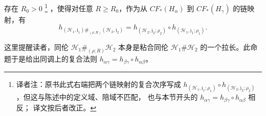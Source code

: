 \begin{proposition}
\label{prop:composition-gluing-chain-maps}
存在 $R_0>0$
\footnote{译者注：原书此式右端把两个链映射的复合次序写成
$h_{(\mathcal H_1,\mathfrak j_1;\rho_1)}\circ
h_{(\mathcal H_2,\mathfrak j_2;\rho_2)}$，但这与陈述中的定义域、陪域不匹配，
也与本节开头的 $h_{\alpha\gamma}=h_{\beta\gamma}\circ h_{\alpha\beta}$ 相反；
译文按后者改正。}
，使得对任意 $R\geq R_0$，作为从 $CF_*(H_\alpha)$ 到
$CF_*(H_\gamma)$ 的链映射，有
\[
 h_{(\mathcal H_1,\mathfrak j_1)\#_{(\rho;R)}
 (\mathcal H_2,\mathfrak j_2)}
 =h_{(\mathcal H_2,\mathfrak j_2;\rho_2)}
 \circ h_{(\mathcal H_1,\mathfrak j_1;\rho_1)}.
\]
\end{proposition}

这里提醒读者，同伦 $\mathcal H_1\#_{(\rho;R)}\mathcal H_2$ 本身是粘合同伦
$\mathcal H_1\#\mathcal H_2$ 的一个拉长。此命题于是给出同调上的复合法则
$h_{\alpha\gamma}=h_{\beta\gamma}\circ h_{\alpha\beta}$。
